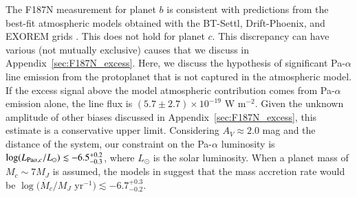 \documentclass[longauth]{aa}
\newcommand{\vc}[1]{#1}
\begin{document}
The F187N measurement for planet $b$ is consistent with predictions from the best-fit atmospheric models obtained with the BT-Settl, Drift-Phoenix, and EXOREM grids %
\citep[details in][]{Wang2021}. This does not hold for planet $c$. %
This discrepancy can have various (not mutually exclusive) causes that we discuss in Appendix~\ref{sec:F187N_excess}. %
Here, we discuss 
the hypothesis of significant Pa-$\alpha$ line emission from the protoplanet that is not captured in the atmospheric model. %
If the excess signal above the model atmospheric contribution comes from Pa-$\alpha$ emission alone, the line flux is
$(5.7 \pm 2.7) \times 10^{-19}$ W m$^{-2}$.
Given the unknown amplitude of other biases discussed in Appendix~\ref{sec:F187N_excess}, this estimate is a conservative upper limit.
Considering $A_V \approx 2.0$ mag \citep{Uyama2021} and the distance of the system, our constraint on the Pa-$\alpha$ luminosity is  $\log(L_{{\rm Pa}\alpha, c}/L_{\odot}) \lesssim -6.5^{+0.2}_{-0.3}$, where $L_{\odot}$ is the solar luminosity. %
\vc{When} a planet mass of $M_c \sim 7 M_J$ \citep{Wang2021} is assumed, the models in \citet{Aoyama2021} suggest that the mass accretion rate would be $ \log(\dot{M_c}/M_J$ yr$^{-1}) \lesssim -6.7^{+0.3}_{-0.2}$.
\end{document}
